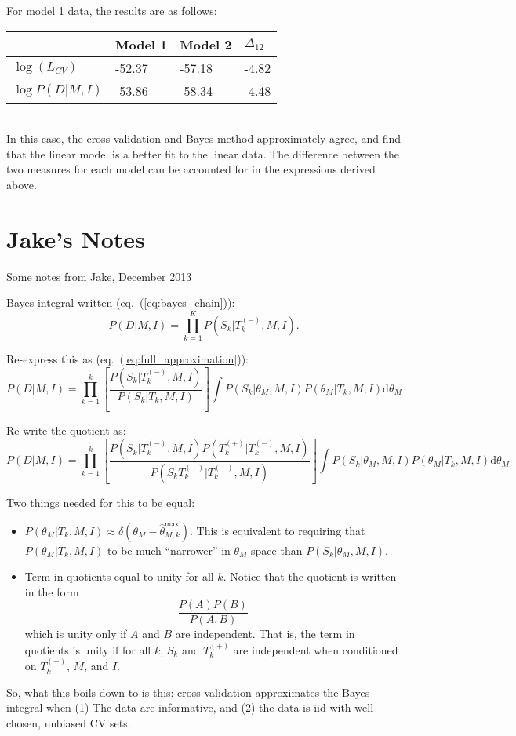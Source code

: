 \documentclass[12pt]{article}
\newcommand{\dd}{\mathrm{d}}
\newcommand{\thetamax}[1]{\ensuremath{\hat{\theta}^{\max}_{#1}}}
\newcommand{\Tkplus}{\ensuremath{T_k^{(+)}}}
\newcommand{\Tkminus}{\ensuremath{T_k^{(-)}}}
\newcommand{\eqn}[1]{eq.~(\ref{eq:#1})}
\begin{document}
For model 1 data, the results are as follows:\\
\begin{tabular}{llll}
\hline
& Model 1 & Model 2 & $\Delta_{12}$\\
\hline
$\log(L_{CV})$ & -52.37 &  -57.18  & -4.82\\
$\log P(D|M,I)$ & -53.86 &  -58.34  & -4.48\\
\hline
\end{tabular}\\
In this case, the cross-validation and Bayes method approximately
agree, and find that the linear model is a better fit to the linear data.
The difference between the two measures for each model can be accounted
for in the expressions derived above.


\section{Jake's Notes}
Some notes from Jake, December 2013

Bayes integral written (\eqn{bayes_chain}):
\begin{equation}
  P(D|M,I) = \prod_{k=1}^K P(S_k|\Tkminus,M,I).
\end{equation}

Re-express this as (\eqn{full_approximation}):
\begin{equation}
  P(D|M, I) = \prod_{k=1}^k
  \left[\frac{P(S_k|\Tkminus,M,I)}
    {P(S_k|T_k,M,I)}
  \right]
  \int P(S_k|\theta_M,M,I) P(\theta_M|T_k,M,I) \dd\theta_M
\end{equation}

Re-write the quotient as:
\begin{equation}
  P(D|M, I) = \prod_{k=1}^k
  \left[\frac{P(S_k|\Tkminus,M,I) P(\Tkplus|\Tkminus,M,I)}
             {P(S_k\Tkplus|\Tkminus,M,I)}
  \right]
  \int P(S_k|\theta_M,M,I) P(\theta_M|T_k,M,I) \dd\theta_M
\end{equation}

Two things needed for this to be equal:
\begin{itemize}

\item $P(\theta_M|T_k,M,I) \approx \delta(\theta_M - \thetamax{M,k})$.  This
  is equivalent to requiring that $P(\theta_M|T_k,M,I)$ to be much ``narrower''
  in $\theta_M$-space than $P(S_k|\theta_M, M, I)$.

\item Term in quotients equal to unity for all $k$.  Notice that the quotient
  is written in the form
  \begin{displaymath}
    \frac{P(A)P(B)}{P(A,B)}
  \end{displaymath}
  which is unity only if $A$ and $B$ are independent.  That is, the term in
  quotients is unity if for all $k$, $S_k$ and $\Tkplus$ are
  independent when conditioned on $\Tkminus$, $M$, and $I$.
\end{itemize}
So, what this boils down to is this: cross-validation approximates the Bayes
integral when (1) The data are informative, and (2) the data is iid with
well-chosen, unbiased CV sets.
\end{document}
